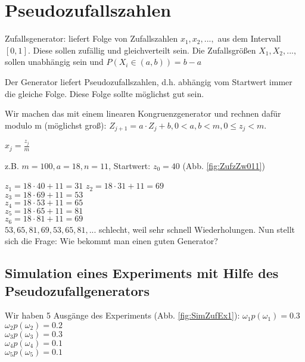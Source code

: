 \renewcommand{\ldate}{2015-12-01}

\section{Pseudozufallszahlen}
Zufallsgenerator: liefert Folge von Zufallszahlen $x_1, x_2, ..., $ aus dem Intervall $[0,1]$. Diese sollen zufällig und gleichverteilt sein. 
Die Zufallsgrößen $X_1, X_2, ..., $ sollen unabhängig sein und $P(X_i \in (a,b)) = b-a$

Der Generator liefert Pseudozufallszahlen, d.h. abhängig vom Startwert immer die gleiche Folge. Diese Folge sollte möglichst gut sein. 

Wir machen das mit einem linearen Kongruenzgenerator und rechnen dafür modulo m (möglichst groß): 
$ Z_{j+1} = a\cdot Z_j + b, 0<a,b<m, 0 \leq z_j < m$.

$ x_j = \frac{z_j}{m}$


z.B. $m=100, a=18, n=11$, Startwert: $z_0 = 40$ (Abb. \ref{fig:ZufzZw011})

$z_1 = 18 \cdot 40 + 11 = 31 $
$z_2 = 18 \cdot 31 + 11 = 69 $\\
$z_3 = 18 \cdot 69 + 11 = 53 $\\
$z_4 = 18 \cdot 53 + 11 = 65 $\\
$z_5 = 18 \cdot 65 + 11 = 81 $\\
$z_6 = 18 \cdot 81 + 11 = 69 $\\
$53, 65, 81, 69, 53, 65, 81, ... $ schlecht, weil sehr schnell Wiederholungen. Nun stellt sich die Frage: Wie bekommt man einen guten Generator? 

\subsection{Simulation eines Experiments mit Hilfe des Pseudozufallgenerators}
Wir haben 5 Ausgänge des Experiments (Abb. \ref{fig:SimZufEx1}): 
$\omega_1 p(\omega_1) = 0.3$\\
$\omega_2 p(\omega_2) = 0.2$\\
$\omega_3 p(\omega_3) = 0.3$\\
$\omega_4 p(\omega_4) = 0.1$\\
$\omega_5 p(\omega_5) = 0.1$\\

